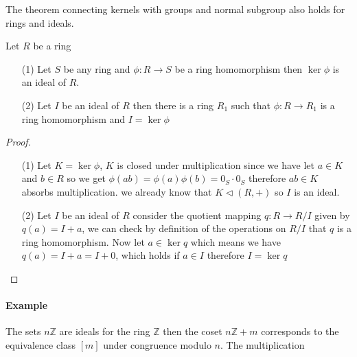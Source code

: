 \documentclass[16pt,a4paper]{article}
\theoremstyle{definition}
\begin{document}
The theorem connecting kernels with groups and normal subgroup  also holds for rings and ideals. 

\begin{thm}{}{}
Let $R$ be a ring
\begin{itemize}
\item[(1)] Let $S$ be any ring and $\phi:R\rightarrow S$ be a ring homomorphism then $\ker \phi$ is an ideal of $R$. 
\item[(2)] Let $I$ be an ideal of $R$ then there is a ring $R_1$ such that
$\phi:R\rightarrow R_1$ is a ring homomorphism and $I = \ker \phi$
\end{itemize}
\end{thm}
\begin{proof}
\begin{itemize}
\item[(1)] Let $K=\ker\phi$, $K$ is closed under multiplication since we have let $a \in K$ and $b\in R$ so we get $\phi(ab)=\phi(a)\phi(b) = 0_S\cdot 0_S$ therefore $ab\in K$ absorbs multiplication.  we already know that $K\lhd (R,+)$  so $I$ is an ideal. 

\item[(2)] Let $I$ be an ideal of $R$ consider the quotient mapping $q:R\rightarrow R/I$ given by $q(a) = I+a$, we can check by definition of the operations on $R/I$ that $q$ is a ring homomorphism.  Now let $a\in \ker q$ which means we have $q(a) = I+a = I+0$, which holds if $a\in I$ therefore $I=\ker q$

\end{itemize}
\end{proof}

\paragraph{Example} The sets $n\mathbb{Z}$ are ideals for the ring $\mathbb{Z}$ then the coset $n\mathbb{Z}+m$ corresponds to the equivalence class $[m]$ under congruence modulo $n$.   The multiplication 
\end{document}
